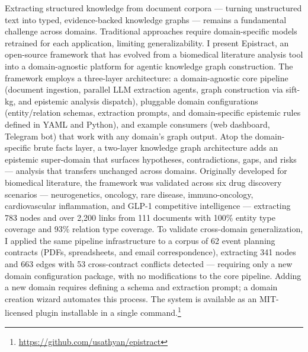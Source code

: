 Extracting structured knowledge from document corpora --- turning unstructured text into typed, evidence-backed knowledge graphs --- remains a fundamental challenge across domains. Traditional approaches require domain-specific models retrained for each application, limiting generalizability. I present Epistract, an open-source framework that has evolved from a biomedical literature analysis tool into a domain-agnostic platform for agentic knowledge graph construction. The framework employs a three-layer architecture: a domain-agnostic core pipeline (document ingestion, parallel LLM extraction agents, graph construction via sift-kg, and epistemic analysis dispatch), pluggable domain configurations (entity/relation schemas, extraction prompts, and domain-specific epistemic rules defined in YAML and Python), and example consumers (web dashboard, Telegram bot) that work with any domain's graph output. Atop the domain-specific brute facts layer, a two-layer knowledge graph architecture adds an epistemic super-domain that surfaces hypotheses, contradictions, gaps, and risks --- analysis that transfers unchanged across domains. Originally developed for biomedical literature, the framework was validated across six drug discovery scenarios --- neurogenetics, oncology, rare disease, immuno-oncology, cardiovascular inflammation, and GLP-1 competitive intelligence --- extracting 783 nodes and over 2,200 links from 111 documents with 100\% entity type coverage and 93\% relation type coverage. To validate cross-domain generalization, I applied the same pipeline infrastructure to a corpus of 62 event planning contracts (PDFs, spreadsheets, and email correspondence), extracting 341 nodes and 663 edges with 53 cross-contract conflicts detected --- requiring only a new domain configuration package, with no modifications to the core pipeline. Adding a new domain requires defining a schema and extraction prompt; a domain creation wizard automates this process. The system is available as an MIT-licensed plugin installable in a single command.\footnote{\url{https://github.com/usathyan/epistract}}
